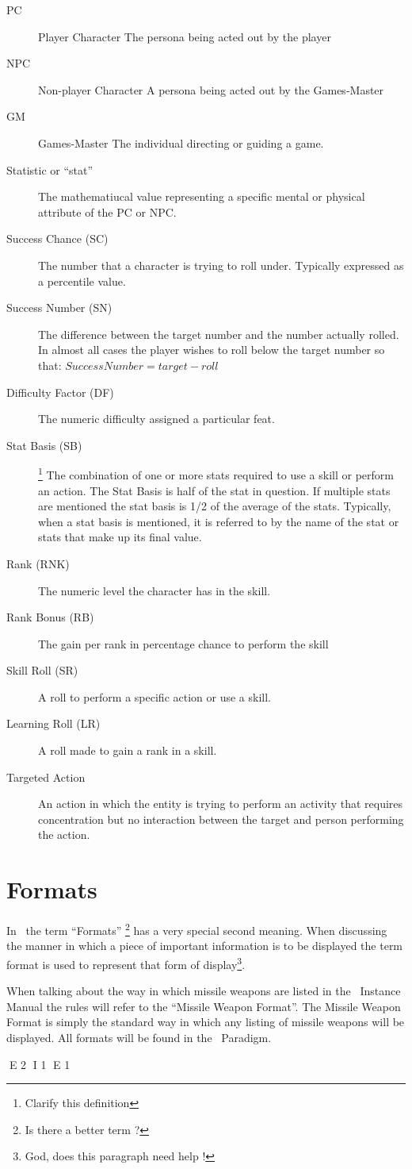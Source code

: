 \begin{description}
	\item[PC] Player Character 
    The persona being acted out by the player
    \item[NPC] Non-player Character
    A persona being acted out by the Games-Master
    \item[GM] Games-Master
    The individual directing or guiding a game.
    \item[Statistic or ``stat'']
    The mathematiucal value representing a specific mental or 
	physical attribute of the PC or NPC.
	\item[Success Chance (SC)] 
	The number that a character is trying to roll under. 
	Typically expressed as a percentile value.
	\item[Success Number (SN)] 
	The difference between the target number and the number actually rolled. In
	almost all cases the player wishes to roll below the target number so that:
	\(Success Number = target - roll\)
	\item[Difficulty Factor (DF)] 
	The numeric difficulty assigned a particular feat.
	\item[Stat Basis (SB)] \footnote{Clarify this definition}
	The combination of one or more stats required to use a skill or perform an
    action. The Stat Basis is half of the stat in question. If 
	multiple stats are mentioned the stat basis is 1/2 of the average 
	of the stats. Typically, when a stat basis is mentioned, it is referred 
	to by the name of the stat or stats that make up its final value.
	\item[Rank (RNK)] 
	The numeric level the character has in the skill.
	\item[Rank Bonus (RB)]
	The gain per rank in percentage chance to perform the skill
	\item[Skill Roll (SR)]
	A roll to perform a specific action or use a skill.
	\item[Learning Roll (LR)]
	A roll made to gain a rank in a skill.
	\item[Targeted Action] 
	An action in which the entity is trying to perform an activity 
	that requires concentration but no interaction between the target 
	and person performing the action.
\end{description}

\section{Formats}

In \SH\ the term ``Formats'' \footnote{Is there a better term ? }
has a very special second meaning. When discussing the manner in 
which a piece of important information is to be displayed the term 
format is used to represent that form of display\footnote{God, does 
this paragraph need help !}. 

When talking about the way in which missile weapons are listed in the 
\SH\ Instance Manual the rules will refer to the 
``Missile Weapon Format''. The Missile Weapon Format is simply the 
standard way in which any listing of missile weapons will be displayed.
All formats will be found in the \SH\ Paradigm.


E 2
I 1
E 1
